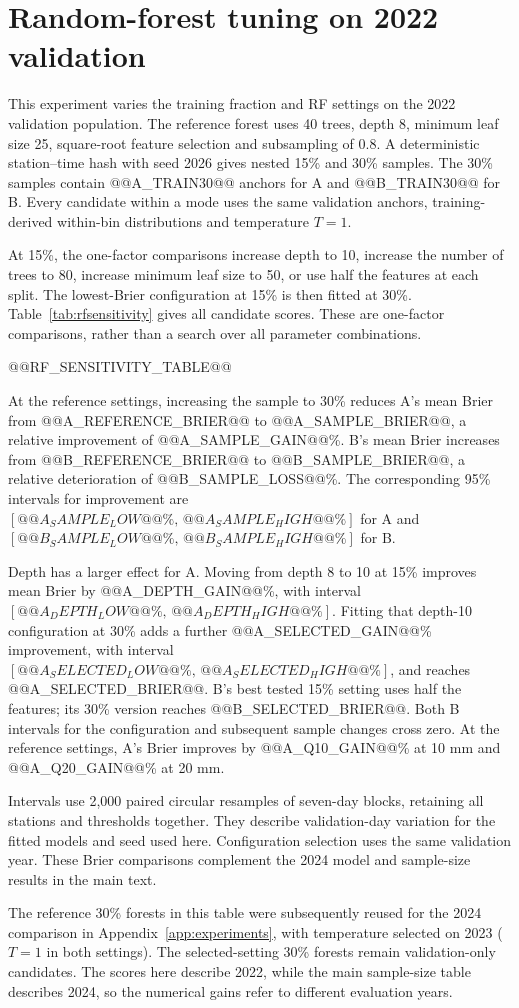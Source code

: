 \section{Random-forest tuning on 2022 validation}\label{sec:rfsensitivity}

This experiment varies the training fraction and RF settings on the 2022 validation population. The reference forest uses 40 trees, depth 8, minimum leaf size 25, square-root feature selection and subsampling of 0.8. A deterministic station--time hash with seed 2026 gives nested 15\% and 30\% samples. The 30\% samples contain @@A_TRAIN30@@ anchors for A and @@B_TRAIN30@@ for B. Every candidate within a mode uses the same validation anchors, training-derived within-bin distributions and temperature $T=1$.

At 15\%, the one-factor comparisons increase depth to 10, increase the number of trees to 80, increase minimum leaf size to 50, or use half the features at each split. The lowest-Brier configuration at 15\% is then fitted at 30\%. Table~\ref{tab:rfsensitivity} gives all candidate scores. These are one-factor comparisons, rather than a search over all parameter combinations.

@@RF_SENSITIVITY_TABLE@@

At the reference settings, increasing the sample to 30\% reduces A's mean Brier from @@A_REFERENCE_BRIER@@ to @@A_SAMPLE_BRIER@@, a relative improvement of @@A_SAMPLE_GAIN@@\%. B's mean Brier increases from @@B_REFERENCE_BRIER@@ to @@B_SAMPLE_BRIER@@, a relative deterioration of @@B_SAMPLE_LOSS@@\%. The corresponding 95\% intervals for improvement are $[@@A_SAMPLE_LOW@@\%,\,@@A_SAMPLE_HIGH@@\%]$ for A and $[@@B_SAMPLE_LOW@@\%,\,@@B_SAMPLE_HIGH@@\%]$ for B.

Depth has a larger effect for A. Moving from depth 8 to 10 at 15\% improves mean Brier by @@A_DEPTH_GAIN@@\%, with interval $[@@A_DEPTH_LOW@@\%,\,@@A_DEPTH_HIGH@@\%]$. Fitting that depth-10 configuration at 30\% adds a further @@A_SELECTED_GAIN@@\% improvement, with interval $[@@A_SELECTED_LOW@@\%,\,@@A_SELECTED_HIGH@@\%]$, and reaches @@A_SELECTED_BRIER@@. B's best tested 15\% setting uses half the features; its 30\% version reaches @@B_SELECTED_BRIER@@. Both B intervals for the configuration and subsequent sample changes cross zero. At the reference settings, A's Brier improves by @@A_Q10_GAIN@@\% at 10 mm and @@A_Q20_GAIN@@\% at 20 mm.

Intervals use 2,000 paired circular resamples of seven-day blocks, retaining all stations and thresholds together. They describe validation-day variation for the fitted models and seed used here. Configuration selection uses the same validation year. These Brier comparisons complement the 2024 model and sample-size results in the main text.

The reference 30\% forests in this table were subsequently reused for the 2024 comparison in Appendix~\ref{app:experiments}, with temperature selected on 2023 ($T=1$ in both settings). The selected-setting 30\% forests remain validation-only candidates. The scores here describe 2022, while the main sample-size table describes 2024, so the numerical gains refer to different evaluation years.
